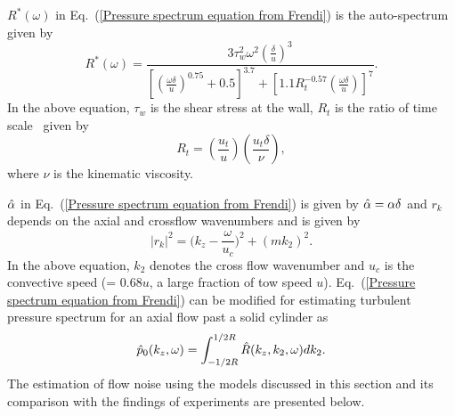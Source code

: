 \documentclass[11pt,cleanfoot]{asme2ej}
\begin{document}
$R^{*}(\omega)$ in Eq.~(\ref{Pressure spectrum equation from Frendi}) is the auto-spectrum given by~\cite{goody2004}
\begin{equation}\label{Auto spectrum equation from Goody}
    R^{*}(\omega) = \frac{3\tau_{w}^{2}\omega^{2}(\frac{\delta}{u})^{3}}{[(\frac{\omega \delta}{u})^{0.75} + 0.5]^{3.7} + [1.1R_{t}^{-0.57}(\frac{\omega \delta}{u})]^{7}}.
\end{equation}
In the above equation, $\tau_{w}$ is the shear stress at the wall, $R_{t}$ is the ratio of time scale~\cite{goody2004} given by
\begin{equation}\label{Time scale equation from Goody}
    R_{t} = \left (\frac{u_{t}}{u}\right)\left(\frac{u_{t}\delta}{\nu}\right),
\end{equation}
where $\nu$ is the kinematic viscosity. 

$\Hat{\alpha}$ in Eq.~(\ref{Pressure spectrum equation from Frendi}) is given by $\Hat{\alpha} = \alpha\delta$ and $r_{k}$ depends on the axial and crossflow wavenumbers and is given by 
\begin{equation}\label{rk equation}
    |{r_{k}}|^{2} = \bigg(k_{z} - \frac{\omega}{u_{c}}\bigg)^{2} + (mk_{2})^{2}.
\end{equation}
In the above equation, $k_{2}$ denotes the cross flow wavenumber and $u_{c}$ is the convective speed (= 0.68$u$, a large fraction of tow speed $u$). Eq.~(\ref{Pressure spectrum equation from Frendi}) can be modified for estimating turbulent pressure spectrum for an axial flow past a solid cylinder as
\begin{equation}\label{One D equation Frendi}
    \Hat{p}_0(k_{z},\omega) = \int_{-1/2R}^{1/2R}\Hat{R}(k_{z},k_{2},\omega)dk_{2}.
\end{equation}
The estimation of flow noise using the models discussed in this section and its comparison with the findings of experiments are presented below.
\end{document}
